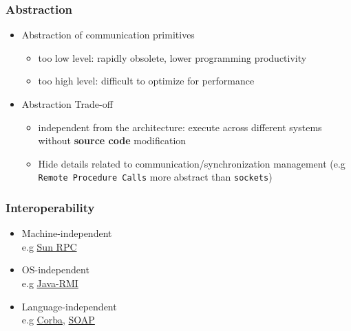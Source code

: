 \documentclass[bigger,hyperref={colorlinks=true, urlcolor=red, plainpages=false, pdfpagelabels, bookmarksnumbered}]{beamer}
\begin{document}
\begin{frame}
\frametitle{Abstraction}
\label{sec-1-6}
\begin{itemize}

\item Abstraction of communication primitives
\label{sec-1-6-1}%
\begin{itemize}
\item too low level: rapidly obsolete, lower programming productivity
\item too high level: difficult to optimize for performance
\end{itemize}

\item Abstraction Trade-off
\label{sec-1-6-2}%
\begin{itemize}
\item independent from the architecture: execute across
      different systems without \textbf{source code} modification
\item Hide details related to communication/synchronization management
      (e.g \texttt{Remote Procedure Calls} more abstract than \texttt{sockets})
\end{itemize}
                                          
\end{itemize} %
\end{frame}
\begin{frame}
\frametitle{Interoperability}
\label{sec-1-7}
\begin{itemize}

\item Machine-independent\\
\label{sec-1-7-1}%
e.g \href{http://www.ietf.org/rfc/rfc1057.txt}{Sun RPC} 
    \vspace{5mm}

\item OS-independent\\
\label{sec-1-7-2}%
e.g \href{http://www.oracle.com/technetwork/java/javase/tech/index-jsp-136424.html}{Java-RMI}
    \vspace{5mm}

\item Language-independent\\
\label{sec-1-7-3}%
e.g \href{http://www.corba.org}{Corba}, \href{http://www.w3.org/TR/soap/}{SOAP}
\end{itemize} %
\end{frame}
\end{document}
